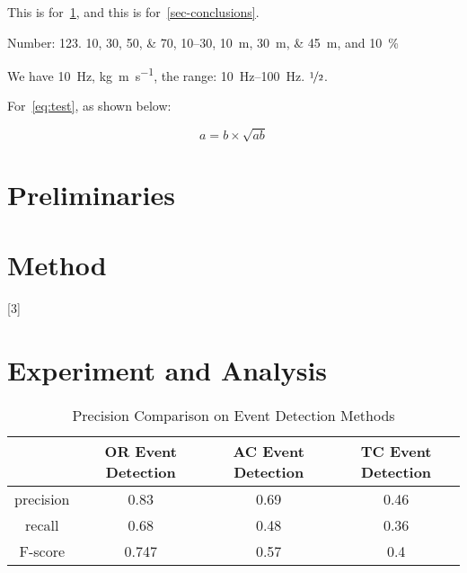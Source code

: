 \documentclass{amsart}
\begin{document}
This is for~\cref{tbl:overall-experiments}, 
and this is for~\cref{sec-conclusions}.
%

Number:
\num{123}.
\numlist{10;30;50;70},
\numrange{10}{30},
\SIlist{10;30;45}{\metre},
and
\SI{10}{\percent}



\begin{ConferenceOnly}
	We have \SI{10}{\hertz},
	\si{\kilogram\metre\per\second},
	the range: \SIrange{10}{100}{\hertz}.
	$\nicefrac[]{1}{2}$.
	
	
\end{ConferenceOnly}


For~\cref{eq:test},
as shown below:

\begin{equation}\label{eq:test}
	a = b \times \sqrt{ab}
\end{equation}

\blindmathpaper

\section{Preliminaries} \label{sec-preliminaries}

\blindtext

\gliMarker  %


\section{Method} \label{sec-method}

\blindtext
{}[3]
\blinditemize
\blindenumerate

\blindmathtrue
\blindmathfalse
\blinddescription

\qwuMarker %

\section{Experiment and Analysis} \label{sec-experiment}


\begin{table}  \centering
	\caption{Precision Comparison on Event Detection Methods}
	\label{tbl:overall-experiments}
	\begin{tabular}{cccc}
		\toprule
		& OR Event Detection & AC Event Detection & TC Event Detection \\
		\midrule
		precision & 0.83 & 0.69 & 0.46 \\
		recall & 0.68 & 0.48 & 0.36 \\
		F-score & 0.747 & 0.57 & 0.4 \\
		\bottomrule
	\end{tabular}
\end{table}
\end{document}
